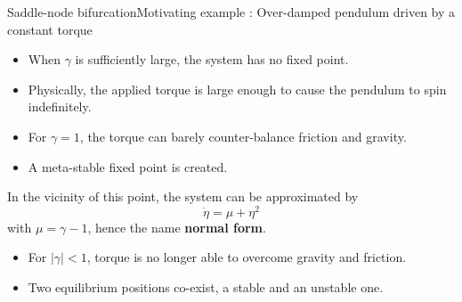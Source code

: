 \documentclass[usenames,dvipsnames,svgnames,10pt,aspectratio=169]{beamer}
\begin{document}
\begin{frame}[t, c]{Saddle-node bifurcation}{Motivating example : Over-damped pendulum driven by a constant torque}
  \begin{minipage}{.48\textwidth}

    \begin{overprint}
      \begin{itemize}
      \item When $\gamma$ is sufficiently large, the system has no fixed point.
        
        \bigskip
        
      \item Physically, the applied torque is large enough to cause the pendulum to spin indefinitely.
      \end{itemize}

      \begin{itemize}
      \item For $\gamma = 1$, the torque can barely counter-balance friction and gravity.

        \medskip

      \item A meta-stable fixed point is created.

      \end{itemize}

      In the vicinity of this point, the system can be approximated by
      \[
      \dot{\eta} = \mu + \eta^2
      \]
      with $\mu = \gamma - 1$, hence the name \textbf{normal form}.
        
      \begin{itemize}
      \item For $\vert \gamma \vert < 1$, torque is no longer able to overcome gravity and friction.

        \bigskip

      \item Two equilibrium positions co-exist, a stable and an unstable one.
      \end{itemize}

    \end{overprint}
  \end{minipage}%
  \hfill
  \begin{minipage}{.48\textwidth}
    \begin{overprint}
      \centering
\end{overprint}
\end{minipage}
\end{frame}
\end{document}
